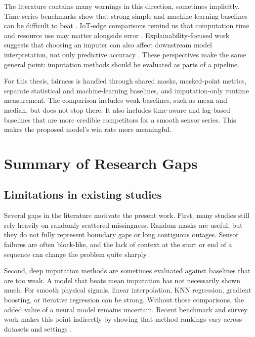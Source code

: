 The literature contains many warnings in this direction, sometimes implicitly. Time-series benchmarks show that strong simple and machine-learning baselines can be difficult to beat \cite{Toye2025BenchmarkingMD,Luo2022}. IoT-edge comparisons remind us that computation time and resource use may matter alongside error \cite{Erhan2021CriticalCO}. Explainability-focused work suggests that choosing an imputer can also affect downstream model interpretation, not only predictive accuracy \cite{Erez2024}. These perspectives make the same general point: imputation methods should be evaluated as parts of a pipeline.

For this thesis, fairness is handled through shared masks, masked-point metrics, separate statistical and machine-learning baselines, and imputation-only runtime measurement. The comparison includes weak baselines, such as mean and median, but does not stop there. It also includes time-aware and lag-based baselines that are more credible competitors for a smooth sensor series. This makes the proposed model's win rate more meaningful.

\section{Summary of Research Gaps}

\subsection{Limitations in existing studies}

Several gaps in the literature motivate the present work. First, many studies still rely heavily on randomly scattered missingness. Random masks are useful, but they do not fully represent boundary gaps or long contiguous outages. Sensor failures are often block-like, and the lack of context at the start or end of a sequence can change the problem quite sharply \cite{Ahmed2022LongGM,Wu2022DataIF,Toye2025BenchmarkingMD}.

Second, deep imputation methods are sometimes evaluated against baselines that are too weak. A model that beats mean imputation has not necessarily shown much. For smooth physical signals, linear interpolation, KNN regression, gradient boosting, or iterative regression can be strong. Without those comparisons, the added value of a neural model remains uncertain. Recent benchmark and survey work makes this point indirectly by showing that method rankings vary across datasets and settings \cite{Miao2023AnES,Toye2025BenchmarkingMD}.

